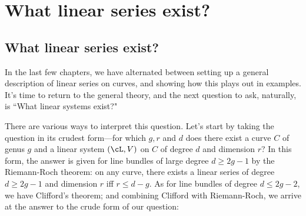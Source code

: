 
%
%
%
%
%
%

\chapter{What linear series exist?}\label{Brill-Noether}

\section{What linear series exist?}

In the last few chapters, we have alternated between setting up a general description of linear series on curves, and showing how this plays out in examples. It's time to return to the general theory, and the next question to ask, naturally, is ``What linear systems exist?"

There are various ways to interpret this question. Let's start by taking the question in its crudest form---for which $g, r$ and $d$ does there exist a curve $C$ of genus $g$ and a linear system $(\cL,V)$ on $C$ of degree $d$ and dimension $r$? In this form, the answer is given for line bundles of large degree $d \geq 2g-1$ by the Riemann-Roch theorem: on any curve, there exists a linear series of degree $d \geq 2g-1$ and dimension $r$ iff $r \leq d-g$. As for line bundles of degree $d \leq 2g-2$, we have Clifford's theorem; and combining Clifford with Riemann-Roch, we arrive at the answer to the crude form of our question:

